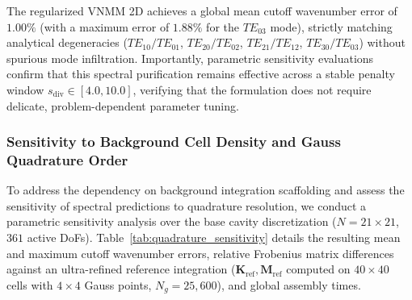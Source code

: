 \documentclass[preprint,12pt]{elsarticle}
\begin{document}
The regularized VNMM 2D achieves a global mean cutoff wavenumber error of $1.00\%$ (with a maximum error of $1.88\%$ for the $TE_{03}$ mode), strictly matching analytical degeneracies ($TE_{10}/TE_{01}$, $TE_{20}/TE_{02}$, $TE_{21}/TE_{12}$, $TE_{30}/TE_{03}$) without spurious mode infiltration. Importantly, parametric sensitivity evaluations confirm that this spectral purification remains effective across a stable penalty window $s_{\mathrm{div}} \in [4.0, 10.0]$, verifying that the formulation does not require delicate, problem-dependent parameter tuning.

\subsubsection{Sensitivity to Background Cell Density and Gauss Quadrature Order}
\label{subsubsec:quadrature_sensitivity}

To address the dependency on background integration scaffolding and assess the sensitivity of spectral predictions to quadrature resolution, we conduct a parametric sensitivity analysis over the base cavity discretization ($N = 21 \times 21$, $361$ active DoFs). Table~\ref{tab:quadrature_sensitivity} details the resulting mean and maximum cutoff wavenumber errors, relative Frobenius matrix differences against an ultra-refined reference integration ($\mathbf{K}_{\mathrm{ref}}, \mathbf{M}_{\mathrm{ref}}$ computed on $40 \times 40$ cells with $4 \times 4$ Gauss points, $N_g = 25{,}600$), and global assembly times.
\end{document}
